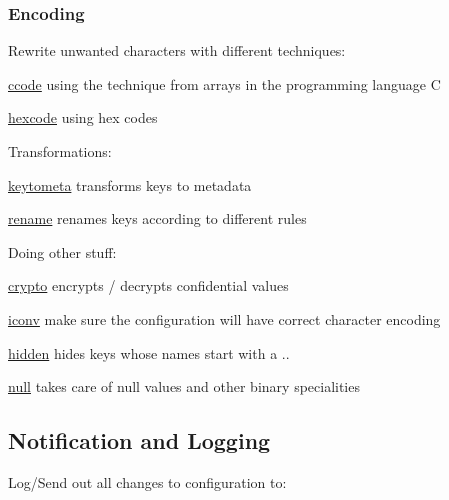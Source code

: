 \subsubsection*{Encoding}

Rewrite unwanted characters with different techniques\+:


\begin{DoxyItemize}
\item \hyperlink{md_src_plugins_ccode_README_src_plugins_ccode_README_md}{ccode} using the technique from arrays in the programming language C
\item \hyperlink{md_src_plugins_hexcode_README_src_plugins_hexcode_README_md}{hexcode} using hex codes
\end{DoxyItemize}

Transformations\+:


\begin{DoxyItemize}
\item \hyperlink{md_src_plugins_keytometa_README_src_plugins_keytometa_README_md}{keytometa} transforms keys to metadata
\item \hyperlink{md_src_plugins_rename_README_src_plugins_rename_README_md}{rename} renames keys according to different rules
\end{DoxyItemize}

Doing other stuff\+:


\begin{DoxyItemize}
\item \hyperlink{md_src_plugins_crypto_README_src_plugins_crypto_README_md}{crypto} encrypts / decrypts confidential values
\item \hyperlink{md_src_plugins_iconv_README_src_plugins_iconv_README_md}{iconv} make sure the configuration will have correct character encoding
\item \hyperlink{md_src_plugins_hidden_README_src_plugins_hidden_README_md}{hidden} hides keys whose names start with a {\ttfamily .}.
\item \hyperlink{md_src_plugins_null_README_src_plugins_null_README_md}{null} takes care of null values and other binary specialities
\end{DoxyItemize}

\subsection*{Notification and Logging}

Log/\+Send out all changes to configuration to\+:


